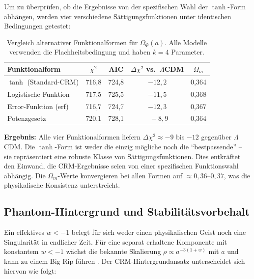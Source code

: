 \documentclass[aps,prd,twocolumn,superscriptaddress,nofootinbib]{revtex4-2}
\begin{document}
Um zu überprüfen, ob die Ergebnisse von der spezifischen Wahl der $\tanh$-Form abhängen, werden vier verschiedene Sättigungsfunktionen unter identischen Bedingungen getestet:

\begin{table}[H]
\centering
\caption{Vergleich alternativer Funktionalformen für $\Omega_\Phi(a)$. Alle Modelle verwenden die Flachheitsbedingung und haben $k=4$ Parameter.}
\label{tab:funcforms}
\begin{tabular}{lcccc}
\toprule
\textbf{Funktionalform} & $\chi^2$ & AIC & $\Delta\chi^2$ vs.\ $\Lambda$CDM & $\Omega_m$ \\
\midrule
$\tanh$ (Standard-CRM) & 716,8 & 724,8 & $-12{,}2$ & 0,364 \\
Logistische Funktion & 717,5 & 725,5 & $-11{,}5$ & 0,368 \\
Error-Funktion (erf) & 716,7 & 724,7 & $-12{,}3$ & 0,367 \\
Potenzgesetz & 720,1 & 728,1 & $\phantom{0}-8{,}9$ & 0,364 \\
\bottomrule
\end{tabular}
\end{table}

\textbf{Ergebnis:} Alle vier Funktionalformen liefern $\Delta\chi^2 \approx -9$ bis $-12$ gegenüber $\Lambda$CDM. Die $\tanh$-Form ist weder die einzig mögliche noch die ``bestpassende'' -- sie repräsentiert eine robuste Klasse von Sättigungsfunktionen. Dies entkräftet den Einwand, die CRM-Ergebnisse seien von einer spezifischen Funktionswahl abhängig. Die $\Omega_m$-Werte konvergieren bei allen Formen auf $\approx 0{,}36$--$0{,}37$, was die physikalische Konsistenz unterstreicht.

\subsection{Phantom-Hintergrund und Stabilitätsvorbehalt}
\label{subsec:phantom}

Ein effektives $w<-1$ belegt für sich weder einen physikalischen Geist noch eine Singularität in endlicher Zeit. Für eine separat erhaltene Komponente mit konstantem $w<-1$ wächst die bekannte Skalierung $\rho\propto a^{-3(1+w)}$ mit $a$ und kann zu einem Big Rip führen \cite{Caldwell1998}. Der CRM-Hintergrundansatz unterscheidet sich hiervon wie folgt:
\end{document}

